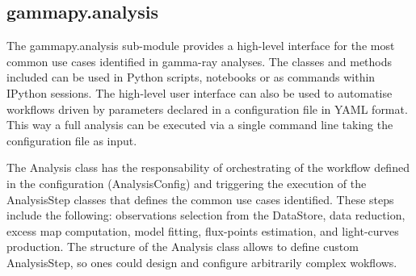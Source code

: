 \subsection{gammapy.analysis}
\label{ssec:gammapy-analysis}

The gammapy.analysis sub-module provides a  high-level interface for the most common use cases identified in gamma-ray analyses. The classes and methods included can be used in Python scripts, notebooks or as commands within IPython sessions. The high-level user interface can also be used to automatise workflows driven by parameters declared in a configuration file in YAML format. This way a full analysis can be executed via a single command line taking the configuration file as input.

The Analysis class has the responsability of orchestrating of the workflow defined in the configuration (AnalysisConfig) and triggering the execution of the AnalysisStep classes that defines the common use cases identified. These steps include the following: 
 observations selection from the DataStore,  data reduction, excess map computation, model fitting, flux-points estimation, and light-curves production. The structure of the Analysis class allows to define custom AnalysisStep,  so ones could design and configure arbitrarily complex wokflows.


